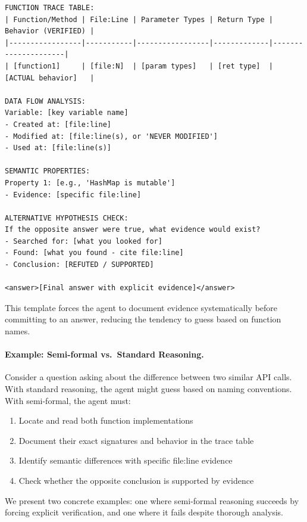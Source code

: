 \documentclass[]{meta}
\begin{document}
\begin{tcolorbox}[
  title=Semi-formal Reasoning Template,
  colback=gray!5,
  colframe=gray!75!black,
  fonttitle=\bfseries,
  breakable,
  enhanced
]
\begin{verbatim}
FUNCTION TRACE TABLE:
| Function/Method | File:Line | Parameter Types | Return Type | Behavior (VERIFIED) |
|-----------------|-----------|-----------------|-------------|---------------------|
| [function1]     | [file:N]  | [param types]   | [ret type]  | [ACTUAL behavior]   |

DATA FLOW ANALYSIS:
Variable: [key variable name]
- Created at: [file:line]
- Modified at: [file:line(s), or 'NEVER MODIFIED']
- Used at: [file:line(s)]

SEMANTIC PROPERTIES:
Property 1: [e.g., 'HashMap is mutable']
- Evidence: [specific file:line]

ALTERNATIVE HYPOTHESIS CHECK:
If the opposite answer were true, what evidence would exist?
- Searched for: [what you looked for]
- Found: [what you found - cite file:line]
- Conclusion: [REFUTED / SUPPORTED]

<answer>[Final answer with explicit evidence]</answer>
\end{verbatim}
\end{tcolorbox}

This template forces the agent to document evidence systematically before committing to an answer, reducing the tendency to guess based on function names.

\paragraph{Example: Semi-formal vs.\ Standard Reasoning.}
Consider a question asking about the difference between two similar API calls. With standard reasoning, the agent might guess based on naming conventions. With semi-formal, the agent must:
\begin{enumerate}
    \item Locate and read both function implementations
    \item Document their exact signatures and behavior in the trace table
    \item Identify semantic differences with specific file:line evidence
    \item Check whether the opposite conclusion is supported by evidence
\end{enumerate}

We present two concrete examples: one where semi-formal reasoning succeeds by forcing explicit verification, and one where it fails despite thorough analysis.
\end{document}
